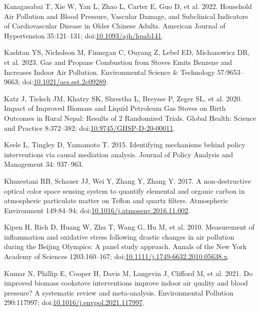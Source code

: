 \documentclass[
  letterpaper,
  DIV=11,
  numbers=noendperiod]{scrartcl}
\newlength{\cslhangindent}
\newlength{\cslentryspacingunit} %
\newenvironment{CSLReferences}[2] %
 {%
  \setlength{\parindent}{0pt}
  \ifodd #1
  \let\oldpar\par
  \def\par{\hangindent=\cslhangindent\oldpar}
  \fi
  \setlength{\parskip}{#2\cslentryspacingunit}
 }%
 {}
\begin{document}
\begin{CSLReferences}{1}{0}
\leavevmode{}%
Kanagasabai T, Xie W, Yan L, Zhao L, Carter E, Guo D, et al. 2022.
Household {Air Pollution} and {Blood Pressure}, {Vascular Damage}, and
{Subclinical Indicators} of {Cardiovascular Disease} in {Older Chinese
Adults}. American Journal of Hypertension 35:121--131;
doi:\href{https://doi.org/10.1093/ajh/hpab141}{10.1093/ajh/hpab141}.

\leavevmode{}%
Kashtan YS, Nicholson M, Finnegan C, Ouyang Z, Lebel ED, Michanowicz DR,
et al. 2023. Gas and {Propane Combustion} from {Stoves Emits Benzene}
and {Increases Indoor Air Pollution}. Environmental Science \&
Technology 57:9653--9663;
doi:\href{https://doi.org/10.1021/acs.est.2c09289}{10.1021/acs.est.2c09289}.

\leavevmode{}%
Katz J, Tielsch JM, Khatry SK, Shrestha L, Breysse P, Zeger SL, et al.
2020. Impact of {Improved Biomass} and {Liquid Petroleum Gas Stoves} on
{Birth Outcomes} in {Rural Nepal}: {Results} of 2 {Randomized Trials}.
Global Health: Science and Practice 8:372--382;
doi:\href{https://doi.org/10.9745/GHSP-D-20-00011}{10.9745/GHSP-D-20-00011}.

\leavevmode{}%
Keele L, Tingley D, Yamamoto T. 2015. Identifying mechanisms behind
policy interventions via causal mediation analysis. Journal of Policy
Analysis and Management 34: 937--963.

\leavevmode{}%
Khuzestani RB, Schauer JJ, Wei Y, Zhang Y, Zhang Y. 2017. A
non-destructive optical color space sensing system to quantify elemental
and organic carbon in atmospheric particulate matter on {Teflon} and
quartz filters. Atmospheric Environment 149:84--94;
doi:\href{https://doi.org/10.1016/j.atmosenv.2016.11.002}{10.1016/j.atmosenv.2016.11.002}.

\leavevmode{}%
Kipen H, Rich D, Huang W, Zhu T, Wang G, Hu M, et al. 2010. Measurement
of inflammation and oxidative stress following drastic changes in air
pollution during the {Beijing Olympics}: A panel study approach. Annals
of the New York Academy of Sciences 1203:160--167;
doi:\href{https://doi.org/10.1111/j.1749-6632.2010.05638.x}{10.1111/j.1749-6632.2010.05638.x}.

\leavevmode{}%
Kumar N, Phillip E, Cooper H, Davis M, Langevin J, Clifford M, et al.
2021. Do improved biomass cookstove interventions improve indoor air
quality and blood pressure? {A} systematic review and meta-analysis.
Environmental Pollution 290:117997;
doi:\href{https://doi.org/10.1016/j.envpol.2021.117997}{10.1016/j.envpol.2021.117997}.


\end{CSLReferences}
\end{document}
